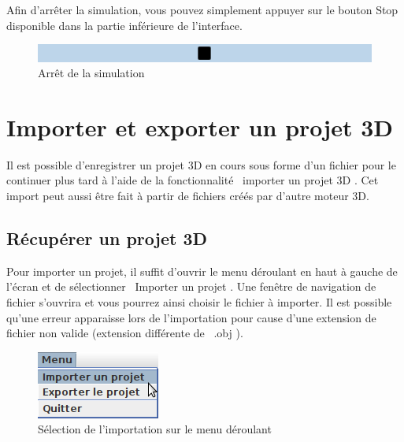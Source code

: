 \documentclass[11pt]{report}
\begin{document}
Afin d'arrêter la simulation, vous pouvez simplement appuyer sur le bouton Stop disponible dans la partie inférieure de l'interface.

\begin{figure}[h]
  \centering
  \includegraphics[width=16cm]{./btn_stop.png}
  \caption{Arrêt de la simulation}
\end{figure}

\chapter{Importer et exporter un projet 3D}

Il est possible d'enregistrer un projet 3D en cours sous forme d'un fichier pour le continuer plus tard à l'aide de
la fonctionnalité \flqq\ importer un projet 3D \frqq. Cet import peut aussi être fait à partir de fichiers créés par d'autre moteur 3D.

\section{Récupérer un projet 3D}

Pour importer un projet, il suffit d'ouvrir le menu déroulant en haut à gauche de l'écran et de sélectionner \flqq\ Importer un projet \frqq.
Une fenêtre de navigation de fichier s'ouvrira et vous pourrez ainsi choisir le fichier à importer.
Il est possible qu'une erreur apparaisse lors de l'importation pour cause d'une extension de fichier non valide (extension différente de \flqq\ .obj \frqq).

\begin{figure}[h]
  \centering
  \includegraphics{./menu_imp.png}
  \caption{Sélection de l'importation sur le menu déroulant}
\end{figure}
\end{document}
